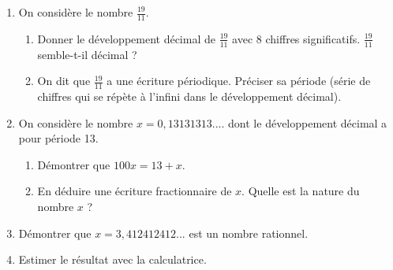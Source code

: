 





\begin{enumerate}
\item On considère le nombre $\frac{19}{11}$.

\begin{enumerate}
\item Donner le développement décimal de $\frac{19}{11}$ avec 8 chiffres significatifs. $\frac{19}{11}$ semble-t-il décimal ?
\item On dit que $\frac{19}{11}$ a une écriture périodique.
Préciser sa période (série de chiffres qui se répète à l'infini dans le développement décimal).
\end{enumerate}
\item On considère le nombre $x=0,13131313....$ dont le développement décimal a pour période 13.
\begin{enumerate}
\item Démontrer que $100x = 13 + x$. 
\item  En déduire une écriture fractionnaire de $x$. Quelle est la nature du nombre $x$ ?
\end{enumerate}
\item Démontrer que $x=3,412412412...$ est un nombre rationnel. 
\item Estimer le résultat avec la calculatrice.
\end{enumerate}
